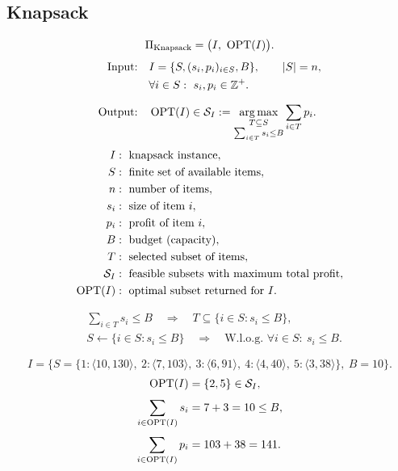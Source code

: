 \documentclass[12pt,a4paper]{article}
\begin{document}
\subsection{Knapsack}

\noindent\begin{minipage}{\linewidth}
\begin{definition}
\[
\Pi_{\mathrm{Knapsack}}
=\bigl(I,\ \operatorname{OPT}(I)\bigr).
\]
\[
\begin{aligned}
\text{Input:}\quad&I=\{S,(s_i,p_i)_{i\in S},B\},\qquad |S|=n,\\
&\forall i\in S:\ s_i,p_i\in\mathbb Z^{+}.\\[6pt]
\text{Output:}\quad&\operatorname{OPT}(I)\in\mathcal S_I:=\operatorname*{arg\,max}_{\substack{T\subseteq S\\\sum_{i\in T}s_i\leq B}}
\sum_{i\in T}p_i.
\end{aligned}
\]
\[
\begin{aligned}
I&:\text{ knapsack instance},\\
S&:\text{ finite set of available items},\\
n&:\text{ number of items},\\
s_i&:\text{ size of item }i,\\
p_i&:\text{ profit of item }i,\\
B&:\text{ budget (capacity)},\\
T&:\text{ selected subset of items},\\
\mathcal S_I&:\text{ feasible subsets with maximum total profit},\\
\operatorname{OPT}(I)&:\text{ optimal subset returned for }I.
\end{aligned}
\]
\end{definition}
\end{minipage}\par

\[
\begin{aligned}
&\sum_{i\in T}s_i\leq B\quad\Longrightarrow\quad
T\subseteq\{i\in S:s_i\leq B\},\\[3pt]
&S\leftarrow\{i\in S:s_i\leq B\}
\quad\Longrightarrow\quad
\text{W.l.o.g. }\forall i\in S:\ s_i\leq B.
\end{aligned}
\]

\noindent\begin{minipage}{\linewidth}
\begin{example}[Knapsack]
\[
I=\{S=\{1:\langle10,130\rangle,\ 2:\langle7,103\rangle,\ 3:\langle6,91\rangle,\
4:\langle4,40\rangle,\ 5:\langle3,38\rangle\},\ B=10\}.
\]
\[
\begin{aligned}
\operatorname{OPT}(I)&=\{2,5\}\in\mathcal S_I,\\[3pt]
\sum_{i\in\operatorname{OPT}(I)}s_i&=7+3=10\leq B,\\[3pt]
\sum_{i\in\operatorname{OPT}(I)}p_i&=103+38=141.
\end{aligned}
\]
\end{example}
\end{minipage}\par
\end{document}
